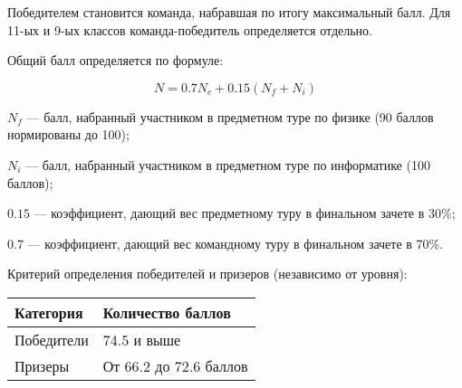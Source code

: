 Победителем становится команда, набравшая по итогу максимальный балл. Для 11-ых и 9-ых классов команда-победитель определяется отдельно.

Общий балл определяется по формуле:

$$N = 0.7N_c +0.15(N_f + N_i)$$

$N_f$ — балл, набранный участником в предметном туре по физике (90 баллов нормированы до 100);

$N_i$ — балл, набранный участником в предметном туре по информатике (100 баллов);

$0.15$ — коэффициент, дающий вес предметному туру в финальном зачете в 30\%;

$0.7$ — коэффициент, дающий вес командному туру в финальном зачете в 70\%.

Критерий определения победителей и призеров (независимо от уровня):
\begin{center}
    \begin{tabular}{|l|l|}
        \hline
        Категория&Количество баллов\\
        \hline
        Победители&74.5 и выше\\
        \hline
        Призеры&От 66.2 до 72.6 баллов\\
        \hline
    \end{tabular}
\end{center}
